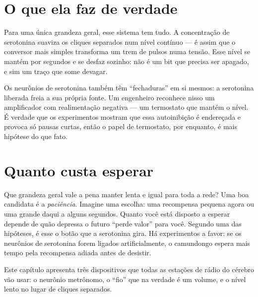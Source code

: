 
\section*{O que ela faz de verdade}

Para uma única grandeza geral, esse sistema tem tudo. A concentração de serotonina suaviza os cliques separados num nível contínuo --- é assim que o conversor mais simples transforma um trem de pulsos numa tensão. Esse nível se mantém por segundos e se desfaz sozinho: não é um bit que precisa ser apagado, e sim um traço que some devagar.

Os neurônios de serotonina também têm ``fechaduras'' em si mesmos: a serotonina liberada freia a sua própria fonte. Um engenheiro reconhece nisso um amplificador com realimentação negativa --- um termostato que mantém o nível. É verdade que os experimentos mostram que essa autoinibição é endereçada e provoca só pausas curtas, então o papel de termostato, por enquanto, é mais hipótese do que fato.

\section*{Quanto custa esperar}

Que grandeza geral vale a pena manter lenta e igual para toda a rede? Uma boa candidata é a \emph{paciência}. Imagine uma escolha: uma recompensa pequena agora ou uma grande daqui a alguns segundos. Quanto você está disposto a esperar depende de quão depressa o futuro ``perde valor'' para você. Segundo uma das hipóteses, é esse o botão que a serotonina gira. Há experimentos a favor: se os neurônios de serotonina forem ligados artificialmente, o camundongo espera mais tempo pela recompensa adiada antes de desistir.

Este capítulo apresenta três dispositivos que todas as estações de rádio do cérebro vão usar: o neurônio metrônomo, o ``fio'' que na verdade é um volume, e o nível lento no lugar de cliques separados.

